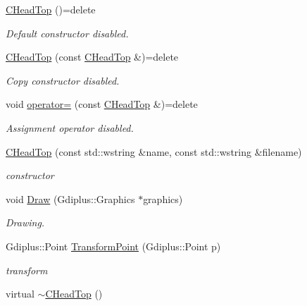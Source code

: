 \begin{DoxyCompactItemize}
\item 
\hypertarget{class_c_head_top_a54fab18f42f367ff9cfdf73537ada62f}{\hyperlink{class_c_head_top_a54fab18f42f367ff9cfdf73537ada62f}{C\+Head\+Top} ()=delete}\label{class_c_head_top_a54fab18f42f367ff9cfdf73537ada62f}

\begin{DoxyCompactList}\small\item\em Default constructor disabled. \end{DoxyCompactList}\item 
\hypertarget{class_c_head_top_a574b5950dff9f90de01219437f475cb9}{\hyperlink{class_c_head_top_a574b5950dff9f90de01219437f475cb9}{C\+Head\+Top} (const \hyperlink{class_c_head_top}{C\+Head\+Top} \&)=delete}\label{class_c_head_top_a574b5950dff9f90de01219437f475cb9}

\begin{DoxyCompactList}\small\item\em Copy constructor disabled. \end{DoxyCompactList}\item 
\hypertarget{class_c_head_top_aeb3522f283f90cb48b7b6a7ed6243aeb}{void \hyperlink{class_c_head_top_aeb3522f283f90cb48b7b6a7ed6243aeb}{operator=} (const \hyperlink{class_c_head_top}{C\+Head\+Top} \&)=delete}\label{class_c_head_top_aeb3522f283f90cb48b7b6a7ed6243aeb}

\begin{DoxyCompactList}\small\item\em Assignment operator disabled. \end{DoxyCompactList}\item 
\hyperlink{class_c_head_top_a31333179dc1836d6ae5b9636b215b66b}{C\+Head\+Top} (const std\+::wstring \&name, const std\+::wstring \&filename)
\begin{DoxyCompactList}\small\item\em constructor \end{DoxyCompactList}\item 
void \hyperlink{class_c_head_top_aa77d9fa703079ee68a4e4e8e3c816932}{Draw} (Gdiplus\+::\+Graphics $\ast$graphics)
\begin{DoxyCompactList}\small\item\em Drawing. \end{DoxyCompactList}\item 
Gdiplus\+::\+Point \hyperlink{class_c_head_top_a631542f2cc871fa17542b3253dc6ab73}{Transform\+Point} (Gdiplus\+::\+Point p)
\begin{DoxyCompactList}\small\item\em transform \end{DoxyCompactList}\item 
\hypertarget{class_c_head_top_a64697c81bc0100f66aa661a8bc430fa9}{virtual \hyperlink{class_c_head_top_a64697c81bc0100f66aa661a8bc430fa9}{$\sim$\+C\+Head\+Top} ()}\label{class_c_head_top_a64697c81bc0100f66aa661a8bc430fa9}


\end{DoxyCompactItemize}
